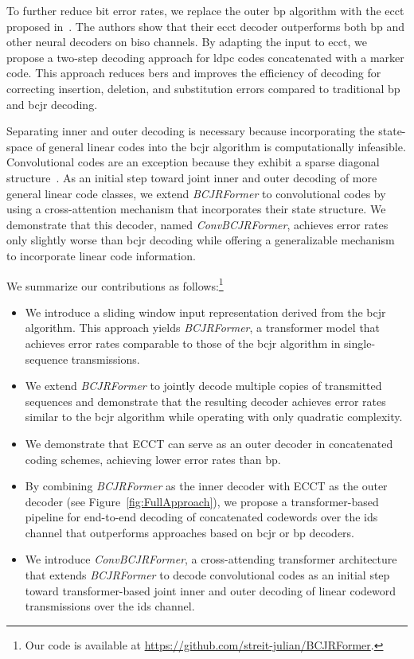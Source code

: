 \documentclass[conference,letterpaperu]{IEEEtran}
\begin{document}
To further reduce bit error rates, we replace the outer \ac{bp} algorithm with the \ac{ecct} proposed in~\cite{choukrounErrorCorrectionCode2022b}.
The authors show that their \ac{ecct} decoder outperforms both \ac{bp} and other neural decoders on \ac{biso} channels. By adapting the input to \ac{ecct}, we propose a two-step decoding approach for \ac{ldpc} codes concatenated with a marker code. This approach reduces \aclp{ber} and improves the efficiency of decoding for correcting insertion, deletion, and substitution errors compared to traditional \ac{bp} and \ac{bcjr} decoding.

Separating inner and outer decoding is necessary because incorporating the state-space of general linear codes into the \ac{bcjr} algorithm is computationally infeasible. Convolutional codes are an exception because they exhibit a sparse diagonal structure~\cite{bahlOptimalDecodingLinear1974}. As an initial step toward joint inner and outer decoding of more general linear code classes, we extend \textit{BCJRFormer} to convolutional codes by using a cross-attention mechanism that incorporates their state structure. We demonstrate that this decoder, named \textit{ConvBCJRFormer}, achieves error rates only slightly worse than \ac{bcjr} decoding while offering a generalizable mechanism to incorporate linear code information. 

We summarize our contributions as follows:\footnote{Our code is available at \url{https://github.com/streit-julian/BCJRFormer}.}
\begin{itemize}
    \item We introduce a sliding window input representation derived from the \ac{bcjr} algorithm. This approach yields \textit{BCJRFormer}, a transformer model that achieves error rates comparable to those of the \ac{bcjr} algorithm in single-sequence transmissions.
    \item We extend \textit{BCJRFormer} to jointly decode multiple copies of transmitted sequences and demonstrate that the resulting decoder achieves error rates similar to the \ac{bcjr} algorithm while operating with only quadratic complexity.
    \item We demonstrate that ECCT can serve as an outer decoder in concatenated coding schemes, achieving lower error rates than \ac{bp}.
    \item By combining \textit{BCJRFormer} as the inner decoder with ECCT as the outer decoder (see Figure~\ref{fig:FullApproach}), we propose a transformer-based pipeline for end-to-end decoding of concatenated codewords over the \ac{ids} channel that outperforms approaches based on \ac{bcjr} or \ac{bp} decoders.
    \item We introduce \emph{ConvBCJRFormer}, a cross-attending transformer architecture that extends \textit{BCJRFormer} to decode convolutional codes as an initial step toward transformer-based joint inner and outer decoding of linear codeword transmissions over the \ac{ids} channel.
\end{itemize}
\end{document}
